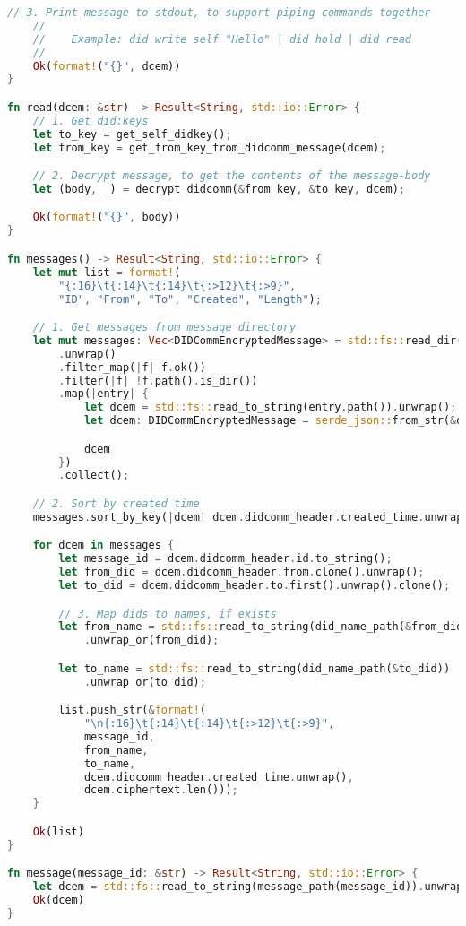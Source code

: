 \begin{lstlisting}[language=Rust]
    // 3. Print message to stdout, to support piping commands together
    //
    //    Example: did write self "Hello" | did hold | did read
    //
    Ok(format!("{}", dcem))
}

fn read(dcem: &str) -> Result<String, std::io::Error> {
    // 1. Get did:keys
    let to_key = get_self_didkey();
    let from_key = get_from_key_from_didcomm_message(dcem);

    // 2. Decrypt message, to get the contents of the message-body
    let (body, _) = decrypt_didcomm(&from_key, &to_key, dcem);

    Ok(format!("{}", body))
}

fn messages() -> Result<String, std::io::Error> {
    let mut list = format!(
        "{:16}\t{:14}\t{:14}\t{:>12}\t{:>9}",
        "ID", "From", "To", "Created", "Length");

    // 1. Get messages from message directory
    let mut messages: Vec<DIDCommEncryptedMessage> = std::fs::read_dir(messages_path())
        .unwrap()
        .filter_map(|f| f.ok())
        .filter(|f| !f.path().is_dir())
        .map(|entry| {
            let dcem = std::fs::read_to_string(entry.path()).unwrap();
            let dcem: DIDCommEncryptedMessage = serde_json::from_str(&dcem).unwrap();

            dcem
        })
        .collect();

    // 2. Sort by created time
    messages.sort_by_key(|dcem| dcem.didcomm_header.created_time.unwrap());

    for dcem in messages {
        let message_id = dcem.didcomm_header.id.to_string();
        let from_did = dcem.didcomm_header.from.clone().unwrap();
        let to_did = dcem.didcomm_header.to.first().unwrap().clone();

        // 3. Map dids to names, if exists
        let from_name = std::fs::read_to_string(did_name_path(&from_did))
            .unwrap_or(from_did);

        let to_name = std::fs::read_to_string(did_name_path(&to_did))
            .unwrap_or(to_did);

        list.push_str(&format!(
            "\n{:16}\t{:14}\t{:14}\t{:>12}\t{:>9}",
            message_id,
            from_name,
            to_name,
            dcem.didcomm_header.created_time.unwrap(),
            dcem.ciphertext.len()));
    }

    Ok(list)
}

fn message(message_id: &str) -> Result<String, std::io::Error> {
    let dcem = std::fs::read_to_string(message_path(message_id)).unwrap();
    Ok(dcem)
}



\end{lstlisting}
